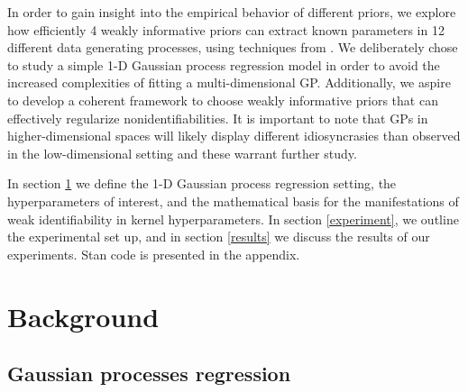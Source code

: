 \documentclass{article}
\begin{document}
In order to gain insight into the empirical behavior of different priors, we
explore how efficiently 4 weakly informative priors can extract known
parameters in 12 different data generating processes, using techniques from
\citet{cook2012validation}. We deliberately chose to study a simple 1-D
Gaussian process regression model in order to avoid the increased complexities
of fitting a multi-dimensional GP.  Additionally, we aspire to develop a
coherent framework to choose weakly informative priors that can effectively
regularize nonidentifiabilities.  It is important to note that GPs in
higher-dimensional spaces will likely display different idiosyncrasies than
observed in the low-dimensional setting and these warrant further study.

In section \ref{background} we define the 1-D Gaussian process regression setting,
the hyperparameters of interest, and the mathematical basis for the manifestations
of weak identifiability in kernel hyperparameters. In section \ref{experiment}, we 
outline the experimental set up, and in section \ref{results} we discuss the results 
of our experiments. Stan code is presented in the appendix.

\section{Background} \label{background}

\subsection{Gaussian processes regression}
\end{document}
